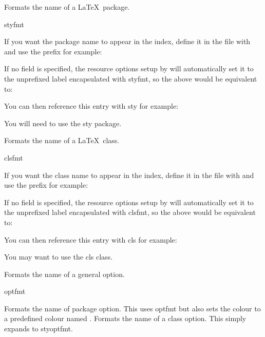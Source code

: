 \documentclass[toc=listof]{scrreport}
\begin{document}
Formats the name of a \LaTeX\ package.
\begin{coderesult}
\gls{styfmt}
\tcblower
{}
\end{coderesult}

If you want the package name to appear in the index, define it in
the  file with  and use the prefix
 for example:
\begin{codebox}
\end{codebox}
If no  field is specified, the resource options setup by
 will automatically set it to the unprefixed label
encapsulated with \gls{styfmt}, so the above would be equivalent to:
\begin{codebox}
\end{codebox}
You can then reference this entry with \gls{sty} for example:
\begin{codebox}
You will need to use the \gls{sty} package.
\end{codebox}

Formats the name of a \LaTeX\ class.
\begin{coderesult}
\gls{clsfmt}
\tcblower
{}
\end{coderesult}

If you want the class name to appear in the index, define it in
the  file with  and use the prefix
 for example:
\begin{codebox}
\end{codebox}
If no  field is specified, the resource options setup by
 will automatically set it to the unprefixed label
encapsulated with \gls{clsfmt}, so the above would be equivalent to:
\begin{codebox}
\end{codebox}
You can then reference this entry with \gls{cls} for example:
\begin{codebox}
You may want to use the \gls{cls} class.
\end{codebox}

Formats the name of a general option.
\begin{coderesult}
\gls{optfmt}
\tcblower
{}
\end{coderesult}
Formats the name of package option. This uses \gls{optfmt} but also
sets the colour to a predefined colour named .
Formats the name of a class option. This simply expands to
\gls{styoptfmt}.
\end{document}
